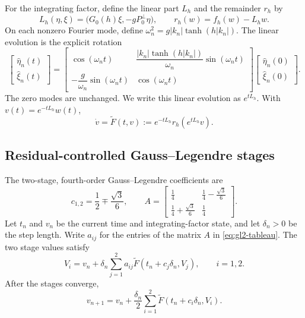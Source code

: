 \documentclass[11pt]{article}
\begin{document}
For the integrating factor, define the linear part $L_h$ and the remainder
$r_h$ by
\begin{equation}
  L_h(\eta,\xi)
  =\bigl(G_0(h)\xi,-gP_0^\perp\eta\bigr),
  \qquad
  r_h(w)=f_h(w)-L_hw.
  \label{eq:reference-linear-split}
\end{equation}
On each nonzero Fourier mode, define
$\omega_n^2=g|k_n|\tanh(h|k_n|)$.  The linear evolution is the explicit
rotation
\begin{equation}
  \begin{bmatrix}\widehat\eta_n(t)\\ \widehat\xi_n(t)\end{bmatrix}
  =
  \begin{bmatrix}
    \cos(\omega_nt) &
      \dfrac{|k_n|\tanh(h|k_n|)}{\omega_n}\sin(\omega_nt)\\[4pt]
    -\dfrac{g}{\omega_n}\sin(\omega_nt) & \cos(\omega_nt)
  \end{bmatrix}
  \begin{bmatrix}\widehat\eta_n(0)\\ \widehat\xi_n(0)\end{bmatrix}.
  \label{eq:linear-mode-evolution}
\end{equation}
The zero modes are unchanged.  We write this linear evolution as $e^{tL_h}$.
With $v(t)=e^{-tL_h}w(t)$,
\begin{equation}
  \dot v=\widetilde F(t,v)
  :=e^{-tL_h}r_h(e^{tL_h}v).
  \label{eq:integrating-factor-field}
\end{equation}

\subsection{Residual-controlled Gauss--Legendre stages}

The two-stage, fourth-order Gauss--Legendre coefficients are
\begin{equation}
  c_{1,2}=\frac12\mp\frac{\sqrt3}{6},\qquad
  A=\begin{bmatrix}
    \frac14&\frac14-\frac{\sqrt3}{6}\\[2pt]
    \frac14+\frac{\sqrt3}{6}&\frac14
  \end{bmatrix}.
  \label{eq:gl2-tableau}
\end{equation}
Let $t_n$ and $v_n$ be the current time and integrating-factor state, and
let $\delta_n>0$ be the step length.  Write $a_{ij}$ for the entries of the
matrix $A$ in \eqref{eq:gl2-tableau}.  The two stage values satisfy
\begin{equation}
  V_i=v_n+\delta_n\sum_{j=1}^{2}a_{ij}
       \widetilde F(t_n+c_j\delta_n,V_j),
  \qquad i=1,2.
  \label{eq:gl2-stages}
\end{equation}
After the stages converge,
\begin{equation}
  v_{n+1}=v_n+\frac{\delta_n}{2}
  \sum_{i=1}^2\widetilde F(t_n+c_i\delta_n,V_i).
  \label{eq:gl2-update}
\end{equation}
\end{document}
